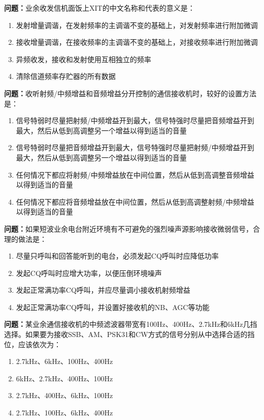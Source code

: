 \bigskip


\noindent\textbf{问题：}业余收发信机面饭上XIT的中文名称和代表的意义是：
\begin{enumerate}[label=\Alph*), leftmargin=3em]
\item 发射增量调谐，在发射频率的主调谐不变的基础上，对发射频率进行附加微调
\item 接收增量调谐，在接收频率的主调谐不变的基础上，对接收频率进行附加微调
\item 异频收发，接收和发射使用互相独立的频率
\item 清除信道频率存贮器的所有数据
\end{enumerate}

\bigskip


\noindent\textbf{问题：}收听射频/中频增益和音频增益分开控制的通信接收机时，较好的设置方法是：
\begin{enumerate}[label=\Alph*), leftmargin=3em]
\item 信号特弱时尽量把射频/中频增益开到最大，信号特强时尽量把音频增益开到最大，然后从低到高调整另一个增益以得到适当的音量
\item 信号特弱时尽量把音频增益开到最大，信号特强时尽量把射频/中频增益开到最大，然后从低到高调整另一个增益以得到适当的音量
\item 任何情况下都应将射频/中频增益放在中间位置，然后从低到高调整音频增益以得到适当的音量
\item 任何情况下都应将音频增益放在中间位置，然后从低到高调整射频/中频增益以得到适当的音量
\end{enumerate}

\bigskip


\noindent\textbf{问题：}如果短波业余电台附近环境有不可避免的强烈噪声源影响接收微弱信号，合理的做法是：
\begin{enumerate}[label=\Alph*), leftmargin=3em]
\item 尽量只呼叫和回答能听到的电台，必须发起CQ呼叫时应降低功率
\item 发起CQ呼叫时应增大功率，以便压倒环境噪声
\item 发起正常满功率CQ呼叫，并应尽量调小接收机射频增益
\item 发起正常满功率CQ呼叫，并设置好接收机的NB、AGC等功能
\end{enumerate}

\bigskip


\noindent\textbf{问题：}某业余通信接收机的中频滤波器带宽有100Hz、400Hz、2.7kHz和6kHz几挡选择。如果要为接收SSB、AM、PSK31和CW方式的信号分别从中选择合适的挡位，应该依次为：
\begin{enumerate}[label=\Alph*), leftmargin=3em]
\item 2.7kHz、6kHz、100Hz、400Hz
\item 6kHz、2.7kHz、400Hz、100Hz
\item 2.7kHz、400Hz、6kHz、100Hz
\item 2.7kHz、100Hz、6kHz、400Hz
\end{enumerate}

